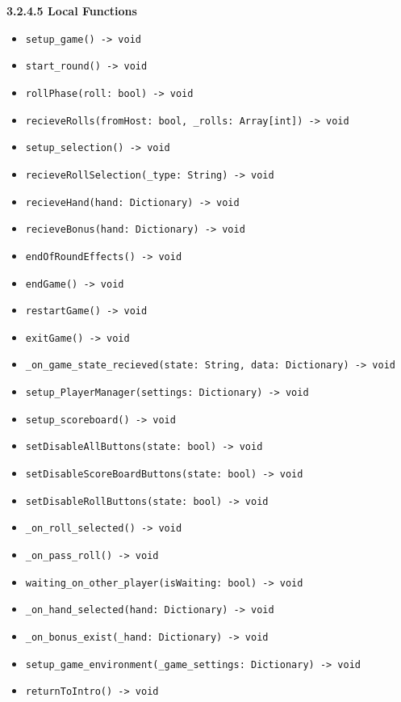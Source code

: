 \documentclass[12pt, titlepage]{article}
\begin{document}
\textbf{3.2.4.5 Local Functions}
\begin{itemize}
    \item \texttt{setup\_game() -> void}
    \item \texttt{start\_round() -> void}
    \item \texttt{rollPhase(roll: bool) -> void}
    \item \texttt{recieveRolls(fromHost: bool, \_rolls: Array[int]) -> void}
    \item \texttt{setup\_selection() -> void}
    \item \texttt{recieveRollSelection(\_type: String) -> void}
    \item \texttt{recieveHand(hand: Dictionary) -> void}
    \item \texttt{recieveBonus(hand: Dictionary) -> void}
    \item \texttt{endOfRoundEffects() -> void}
    \item \texttt{endGame() -> void}
    \item \texttt{restartGame() -> void}
    \item \texttt{exitGame() -> void}
    \item \texttt{\_on\_game\_state\_recieved(state: String, data: Dictionary) -> void}
    \item \texttt{setup\_PlayerManager(settings: Dictionary) -> void}
    \item \texttt{setup\_scoreboard() -> void}
    \item \texttt{setDisableAllButtons(state: bool) -> void}
    \item \texttt{setDisableScoreBoardButtons(state: bool) -> void}
    \item \texttt{setDisableRollButtons(state: bool) -> void}
    \item \texttt{\_on\_roll\_selected() -> void}
    \item \texttt{\_on\_pass\_roll() -> void}
    \item \texttt{waiting\_on\_other\_player(isWaiting: bool) -> void}
    \item \texttt{\_on\_hand\_selected(hand: Dictionary) -> void}
    \item \texttt{\_on\_bonus\_exist(\_hand: Dictionary) -> void}
    \item \texttt{setup\_game\_environment(\_game\_settings: Dictionary) -> void}
    \item \texttt{returnToIntro() -> void}
\end{itemize}
\end{document}
